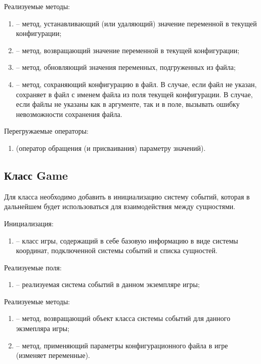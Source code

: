 	\noindent Реализуемые методы:
	\begin{enumerate}
		\item {} -- метод, устанавливающий (или удаляющий) значение переменной в текущей конфигурации;
		\item {} -- метод, возвращающий значение переменной в текущей конфигурации;
		\item {} -- метод, обновляющий значения переменных, подгруженных из файла;
		\item {} -- метод, сохраняющий конфигурацию в файл. В случае, если файл не указан, сохраняет в файл с именем файла из поля  текущей конфигурации. В случае, если файлы не указаны как в аргументе, так и в поле, вызывать ошибку невозможности сохранения файла.
	\end{enumerate}

	\noindent Перегружаемые операторы:
	\begin{enumerate}
		\item {} (оператор обращения (и присваивания) параметру значений).
	\end{enumerate}


\subsection{Класс Game}
	Для класса  необходимо добавить в инициализацию систему событий, которая в дальнейшем будет использоваться для взаимодействия между сущностями.

	\noindent Инициализация:
	\begin{enumerate}
		\item {} -- класс игры, содержащий в себе базовую информацию в виде системы координат, подключенной системы событий и списка сущностей.
	\end{enumerate}

	\noindent Реализуемые поля:
	\begin{enumerate}
		\item {} -- реализуемая система событий в данном экземпляре игры;
	\end{enumerate}

	\noindent Реализуемые методы:
	\begin{enumerate}
		\item {} -- метод, возвращающий объект класса системы событий для данного экзмепляра игры;
		\item {} -- метод, применяющий параметры конфигурационного файла в игре (изменяет переменные).
	\end{enumerate}


